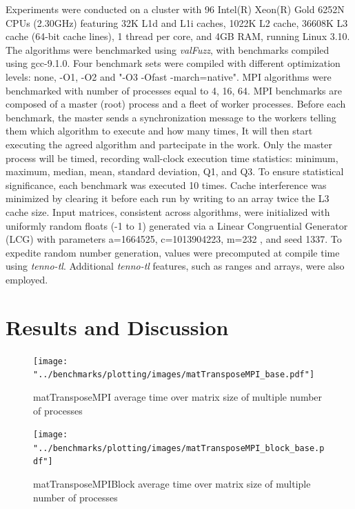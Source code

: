 \documentclass[conference]{IEEEtran}
\begin{document}
Experiments were conducted on a cluster with 96 Intel(R) Xeon(R) Gold
6252N CPUs (2.30GHz) featuring 32K L1d and L1i caches, 1022K L2 cache,
36608K L3 cache (64-bit cache lines), 1 thread per core, and 4GB RAM,
running Linux 3.10. The algorithms were benchmarked using \textit{valFuzz},
with benchmarks compiled using gcc-9.1.0. Four benchmark sets were
compiled with different optimization levels: none, -O1, -O2 and "-O3
-Ofast -march=native".
MPI algorithms were benchmarked with number of processes equal to 4, 16, 64.
MPI benchmarks are composed of a master (root) process and a fleet
of worker processes. Before each benchmark, the master sends
a synchronization message to the workers telling them which algorithm
to execute and how many times, It will then start executing the agreed
algorithm and partecipate in the work. Only the master process will be
timed, recording wall-clock execution time statistics: minimum, maximum,
median, mean, standard deviation, Q1, and Q3. To ensure statistical
significance, each benchmark was executed 10 times. Cache interference was
minimized by clearing it before each run by writing to an array twice
the L3 cache size. Input matrices, consistent across algorithms, were
initialized with uniformly random floats (-1 to 1) generated via a
Linear Congruential Generator (LCG) \cite{b8} with parameters a=1664525,
c=1013904223, m=232 \cite{b9}, and seed 1337.
To expedite random number generation, values were precomputed at
compile time using \textit{tenno-tl}. Additional \textit{tenno-tl}
features, such as ranges and arrays, were also employed.

\section{Results and Discussion}

\begin{figure}[htb]
	\centering
	\texttt{[image: "../benchmarks/plotting/images/matTransposeMPI\_base.pdf"]}
	\caption{matTransposeMPI average time over matrix size of multiple number of processes}
	\label{fig:transpose_mpi_base}
\end{figure}

\begin{figure}[htb]
	\centering
	\texttt{[image: "../benchmarks/plotting/images/matTransposeMPI\_block\_base.pdf"]}
	\caption{matTransposeMPIBlock average time over matrix size of multiple number of processes}
	\label{fig:transpose_mpi_block}
\end{figure}
\end{document}
